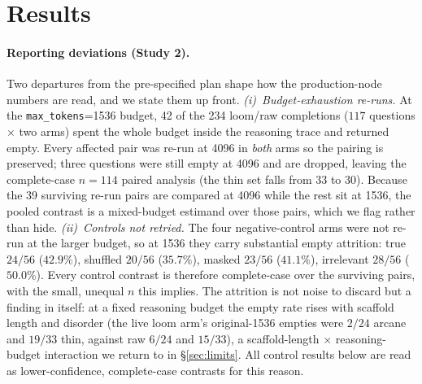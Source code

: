 \documentclass[10pt,twocolumn]{article}
\begin{document}
\section{Results}\label{sec:results}
\paragraph{Reporting deviations (Study 2).} Two departures from the pre-specified plan shape how the
production-node numbers are read, and we state them up front. \emph{(i)~Budget-exhaustion re-runs.}
At the \texttt{max\_tokens}=1536 budget, 42 of the 234 loom/raw completions ($117$ questions $\times$
two arms) spent the whole budget inside the reasoning trace and returned empty. Every affected pair
was re-run at 4096 in \emph{both} arms so the pairing is preserved; three questions were still empty
at 4096 and are dropped, leaving the complete-case $n=114$ paired analysis (the thin set falls from
33 to 30). Because the 39 surviving re-run pairs are compared at 4096 while the rest sit at 1536, the
pooled contrast is a mixed-budget estimand over those pairs, which we flag rather than hide. \emph{(ii)~Controls not retried.} The four negative-control arms were not re-run at the
larger budget, so at 1536 they carry substantial empty attrition: true $24/56$ ($42.9\%$), shuffled
$20/56$ ($35.7\%$), masked $23/56$ ($41.1\%$), irrelevant $28/56$ ($50.0\%$). Every control
contrast is therefore complete-case over the surviving pairs, with the small, unequal $n$ this
implies. The attrition is not noise to discard but a finding in itself: at a fixed reasoning budget
the empty rate rises with scaffold length and disorder (the live loom arm's original-1536 empties
were $2/24$ arcane and $19/33$ thin, against raw $6/24$ and $15/33$), a scaffold-length
$\times$ reasoning-budget interaction we return to in \S\ref{sec:limits}. All control results below are
read as lower-confidence, complete-case contrasts for this reason.
\end{document}
